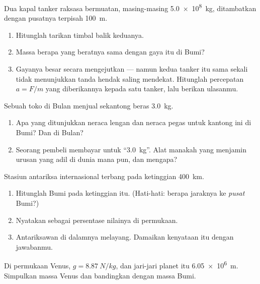 \begin{exercise}[$\star\star$]\label{exo:g10:universal-gravitation:6}
Dua kapal tanker raksasa bermuatan, masing-masing \qty{5.0e8}{kg},
ditambatkan dengan pusatnya terpisah \qty{100}{m}.
\begin{enumerate}
  \item Hitunglah tarikan  timbal balik keduanya.
  \item Massa berapa yang beratnya sama dengan gaya itu di Bumi?
  \item Gayanya besar secara mengejutkan --- namun kedua tanker itu
        sama sekali tidak menunjukkan tanda hendak saling mendekat.
        Hitunglah percepatan $a = F/m$ yang diberikannya kepada satu
        tanker, lalu berikan ulasanmu.
\end{enumerate}
\end{exercise}

\begin{exercise}[$\star\star$]\label{exo:g10:universal-gravitation:7}
Sebuah toko di Bulan menjual sekantong beras \qty{3.0}{kg}.
\begin{enumerate}
  \item Apa yang ditunjukkan neraca lengan dan neraca pegas untuk
        kantong ini di Bumi? Dan di Bulan?
  \item Seorang pembeli membayar untuk ``\qty{3.0}{kg}''. Alat manakah
        yang menjamin urusan yang adil di dunia mana pun, dan mengapa?
\end{enumerate}
\end{exercise}

\begin{exercise}[$\star\star$]\label{exo:g10:universal-gravitation:8}
Stasiun antariksa internasional terbang pada ketinggian \qty{400}{km}.
\begin{enumerate}
  \item Hitunglah  Bumi pada ketinggian itu.
        (Hati-hati: berapa jaraknya ke \emph{pusat} Bumi?)
  \item Nyatakan sebagai persentase nilainya di permukaan.
  \item Antariksawan di dalamnya melayang. Damaikan kenyataan itu
        dengan jawabanmu.
\end{enumerate}
\end{exercise}

\begin{exercise}[$\star\star$]\label{exo:g10:universal-gravitation:9}
Di permukaan Venus, $g = \qty{8.87}{N/kg}$, dan jari-jari planet itu
\qty{6.05e6}{m}. Simpulkan massa Venus dan bandingkan dengan massa
Bumi.
\end{exercise}

